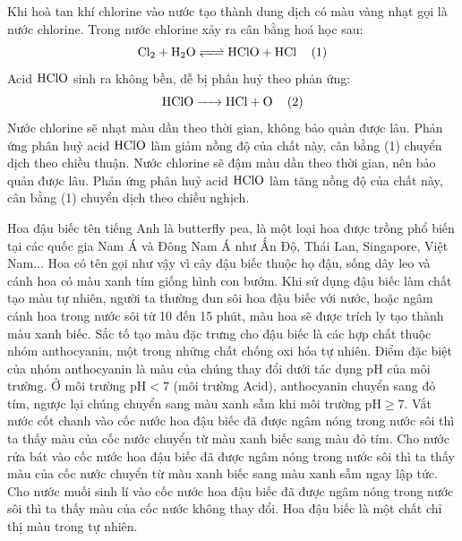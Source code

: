 \documentclass[12pt,a4paper]{article}
\begin{document}
\begin{ex}
Khi hoà tan khí chlorine vào nước tạo thành dung dịch có màu vàng nhạt gọi là nước chlorine. Trong nước chlorine xảy ra cân bằng hoá học sau:
\[\ce{Cl2 + H2O <=> HClO + HCl \quad (1)}\]
Acid $\ce{HClO}$ sinh ra không bền, dễ bị phân huỷ theo phản ứng:
\[\ce{HClO -> HCl + O \quad (2)}\]
\choiceTF
{Nước chlorine sẽ nhạt màu dần theo thời gian, không bảo quản được lâu.}
{Phản ứng phân huỷ acid $\ce{HClO}$ làm giảm nồng độ của chất này, cân bằng (1) chuyển dịch theo chiều thuận.}
{Nước chlorine sẽ đậm màu dần theo thời gian, nên bảo quản được lâu.}
{Phản ứng phân huỷ acid $\ce{HClO}$ làm tăng nồng độ của chất này, cân bằng (1) chuyển dịch theo chiều nghịch.}
\loigiai{}
\end{ex}

\begin{ex}
Hoa đậu biếc tên tiếng Anh là butterfly pea, là một loại hoa được trồng phổ biến tại các quốc gia Nam Á và Đông Nam Á như Ấn Độ, Thái Lan, Singapore, Việt Nam... Hoa có tên gọi như vậy vì cây đậu biếc thuộc họ đậu, sống dây leo và cánh hoa có màu xanh tím giống hình con bướm. Khi sử dụng đậu biếc làm chất tạo màu tự nhiên, người ta thường đun sôi hoa đậu biếc với nước, hoặc ngâm cánh hoa trong nước sôi từ 10 đến 15 phút, màu hoa sẽ được trích ly tạo thành màu xanh biếc. Sắc tố tạo màu đặc trưng cho đậu biếc là các hợp chất thuộc nhóm anthocyanin, một trong những chất chống oxi hóa tự nhiên. Điểm đặc biệt của nhóm anthocyanin là màu của chúng thay đổi dưới tác dụng pH của môi trường. Ở môi trường $\text{pH} < 7$ (môi trường Acid), anthocyanin chuyển sang đỏ tím, ngược lại chúng chuyển sang màu xanh sẫm khi môi trường $\text{pH} \ge 7$.
\choiceTF
{Vắt nước cốt chanh vào cốc nước hoa đậu biếc đã được ngâm nóng trong nước sôi thì ta thấy màu của cốc nước chuyển từ màu xanh biếc sang màu đỏ tím.}
{Cho nước rửa bát vào cốc nước hoa đậu biếc đã được ngâm nóng trong nước sôi thì ta thấy màu của cốc nước chuyển từ màu xanh biếc sang màu xanh sẫm ngay lập tức.}
{Cho nước muối sinh lí vào cốc nước hoa đậu biếc đã được ngâm nóng trong nước sôi thì ta thấy màu của cốc nước không thay đổi.}
{Hoa đậu biếc là một chất chỉ thị màu trong tự nhiên.}
\loigiai{}
\end{ex}
\end{document}
